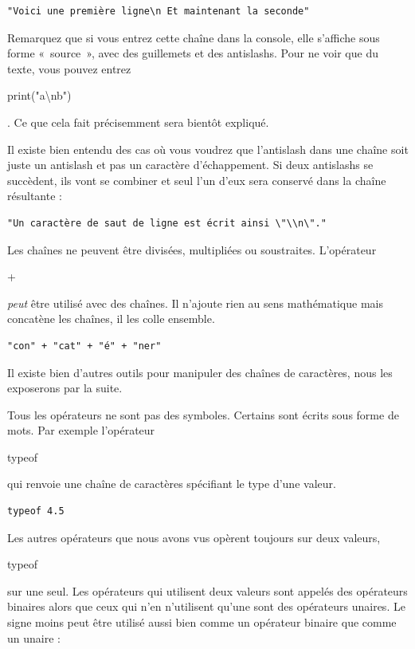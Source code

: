 \documentclass{FramateX}
\renewcommand{\texttt}[1]{\begin{sffamily}{#1}\end{sffamily}}
\begin{document}
\begin{lstlisting}
"Voici une première ligne\n Et maintenant la seconde"
\end{lstlisting}
Remarquez que si vous entrez cette chaîne dans la console, elle
s'affiche sous forme «~source~», avec des guillemets et des antislashs.
Pour ne voir que du texte, vous pouvez entrez
\texttt{print("a\textbackslash{}nb")}. Ce que cela fait précisemment
sera bientôt expliqué.

Il existe bien entendu des cas où vous voudrez que l'antislash dans une
chaîne soit juste un antislash et pas un caractère d'échappement. Si
deux antislashs se succèdent, ils vont se combiner et seul l'un d'eux
sera conservé dans la chaîne résultante :

\begin{lstlisting}
"Un caractère de saut de ligne est écrit ainsi \"\\n\"."
\end{lstlisting}
\begin{center}\end{center}

Les chaînes ne peuvent être divisées, multipliées ou soustraites.
L'opérateur \texttt{+} \emph{peut} être utilisé avec des chaînes. Il
n'ajoute rien au sens mathématique mais concatène les chaînes, il les
colle ensemble.

\begin{lstlisting}
"con" + "cat" + "é" + "ner"
\end{lstlisting}
Il existe bien d'autres outils pour manipuler des chaînes de caractères,
nous les exposerons par la suite.

\begin{center}\end{center}

Tous les opérateurs ne sont pas des symboles. Certains sont écrits sous
forme de mots. Par exemple l'opérateur \texttt{typeof} qui renvoie une
chaîne de caractères spécifiant le type d'une valeur.

\begin{lstlisting}
typeof 4.5
\end{lstlisting}
Les autres opérateurs que nous avons vus opèrent toujours sur deux
valeurs, \texttt{typeof} sur une seul. Les opérateurs qui utilisent deux
valeurs sont appelés des opérateurs binaires alors que ceux qui n'en
n'utilisent qu'une sont des opérateurs unaires. Le signe moins peut être
utilisé aussi bien comme un opérateur binaire que comme un unaire :
\end{document}
